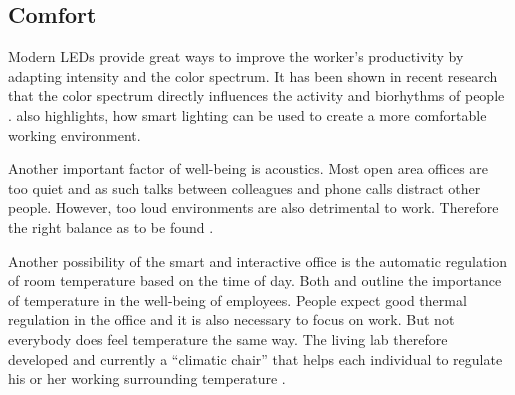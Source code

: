 \subsection{Comfort}\label{sec:comfort}

Modern LEDs provide great ways to improve the worker's productivity by adapting intensity and the color spectrum. It has been shown in recent research that the color spectrum directly influences the activity and biorhythms of people  \cite{living-lab}. \cite{iotagenda} also highlights, how smart lighting can be used to create a more comfortable working environment.

Another important factor of well-being is acoustics. Most open area offices are too quiet and as such talks between colleagues and phone calls distract other people. However, too loud environments are also detrimental to work. Therefore the right balance as to be found \cite{living-lab}. 

Another possibility of the smart and interactive office is the automatic regulation of room temperature based on the time of day. Both \cite{iotagenda} and \cite{living-lab} outline the importance of temperature in the well-being of employees. People expect good thermal regulation in the office and it is also necessary to focus on work. But not everybody does feel temperature the same way. The living lab therefore developed and currently a ``climatic chair'' that helps each individual to regulate his or her working surrounding temperature \cite{living-lab}.


